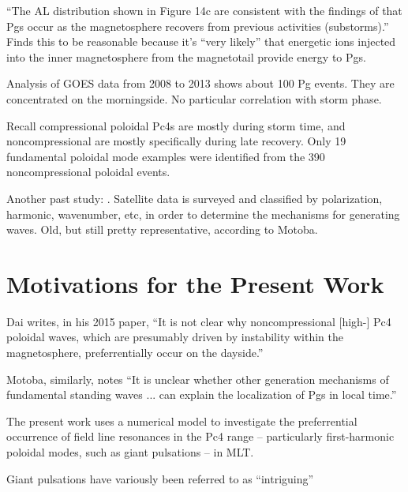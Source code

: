 ``The AL distribution shown in Figure 14c are consistent with the findings of \cite{rostoker_1979} that Pgs occur as the magnetosphere recovers from previous activities (substorms).''\cite{motoba_2015} Finds this to be reasonable because it's ``very likely'' that energetic ions injected into the inner magnetosphere from the magnetotail provide energy to Pgs. 

Analysis of GOES data from 2008 to 2013 shows about 100 Pg events. They are concentrated on the morningside. No particular correlation with storm phase\cite{motoba_2015}. 

Recall compressional poloidal Pc4s are mostly during storm time, and noncompressional are mostly specifically during late recovery\cite{dai_2015}. Only 19 fundamental poloidal mode examples were identified from the 390 noncompressional poloidal events. 

Another past study: \cite{takahashi_1984}. Satellite data is surveyed and classified by polarization, harmonic, wavenumber, etc, in order to determine the mechanisms for generating \Alfven waves. Old, but still pretty representative, according to Motoba\cite{motoba_2015}. 

\section{Motivations for the Present Work}

Dai writes, in his 2015 paper\cite{dai_2015}, ``It is not clear why noncompressional [high-\azm] Pc4 poloidal waves, which are presumably driven by instability within the magnetosphere, preferrentially occur on the dayside.'' 

Motoba\cite{motoba_2015}, similarly, notes ``It is unclear whether other generation mechanisms of fundamental standing waves ... can explain the localization of Pgs in local time.''

The present work uses a numerical model to investigate the preferrential occurrence of field line resonances in the Pc4 range -- particularly first-harmonic poloidal modes, such as giant pulsations -- in MLT. 



Giant pulsations have variously been referred to as ``intriguing''\cite{green_1985}

